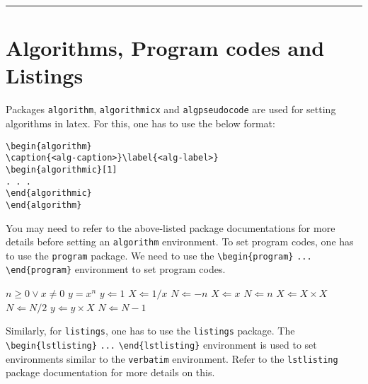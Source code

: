 \documentclass[unnumsec,webpdf,contemporary,large]{oup-authoring-template}%
\theoremstyle{thmstyleone}%
\theoremstyle{thmstyletwo}%
\theoremstyle{thmstylethree}%
\begin{document}
\begin{sidewaysfigure}%
	\centering
	{\color{black!20}\rule{610pt}{102pt}}
	\caption{This is an example for a sideways figure. This is an example of a long caption this is an example of a long caption  this is an example of a long caption this is an example of a long caption}\label{fig3}
\end{sidewaysfigure}



\section{Algorithms, Program codes and Listings}\label{sec7}

Packages \verb+algorithm+, \verb+algorithmicx+ and \verb+algpseudocode+ are used for setting algorithms in latex.
For this, one has to use the below format:


\begin{verbatim}
\begin{algorithm}
\caption{<alg-caption>}\label{<alg-label>}
\begin{algorithmic}[1]
. . .
\end{algorithmic}
\end{algorithm}
\end{verbatim}


You may need to refer to the above-listed package documentations for more details before setting an \verb+algorithm+ environment.
To set program codes, one has to use the \verb+program+ package. We need to use the \verb+\begin{program}+ \verb+...+
\verb+\end{program}+ environment to set program codes.

\begin{algorithm}[!t]
	\caption{Calculate $y = x^n$}\label{algo1}
	\begin{algorithmic}[1]
		\Require $n \geq 0 \vee x \neq 0$
		\Ensure $y = x^n$
		\State $y \Leftarrow 1$
		\State $X \Leftarrow 1 / x$
		\State $N \Leftarrow -n$
		\Else
		\State $X \Leftarrow x$
		\State $N \Leftarrow n$
		\EndIf
		\State $X \Leftarrow X \times X$
		\State $N \Leftarrow N / 2$
		\Else[$N$ is odd]
		\State $y \Leftarrow y \times X$
		\State $N \Leftarrow N - 1$
		\EndIf
		\EndWhile
	\end{algorithmic}
\end{algorithm}

Similarly, for \verb+listings+, one has to use the \verb+listings+ package. The \verb+\begin{lstlisting}+ \verb+...+ \verb+\end{lstlisting}+ environment is used to set environments similar to the \verb+verbatim+ environment. Refer to the \verb+lstlisting+ package documentation for more details on this.
\end{document}
